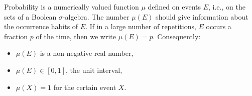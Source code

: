 Probability is a numerically valued function $\mu$ defined on events $E$, i.e., on the sets of a Boolean $\sigma$-algebra. The number $\mu(E)$ should give information about the occurrence habits of $E$. If in a large number of repetitions, $E$ occurs a fraction $p$ of the time, then we write $\mu(E) = p$. Consequently:
\begin{itemize}
\item $\mu(E)$ is a non-negative real number,
\item $\mu(E) \in [0,1]$, the unit interval,
\item $\mu(X) = 1$ for the certain event $X$.
\end{itemize}
